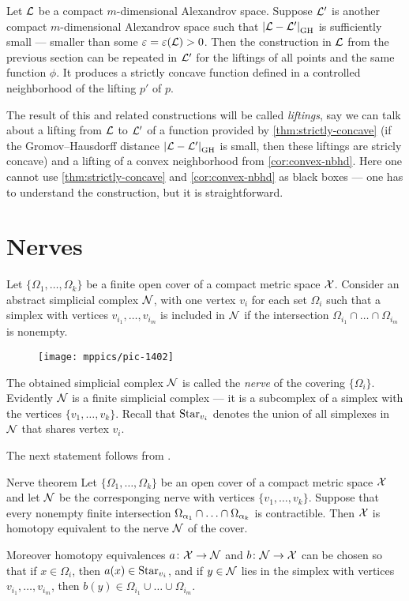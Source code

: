 Let $\mathcal{L}$ be  a compact $m$-dimensional Alexandrov space.
Suppose $\mathcal{L}'$ is another compact $m$-dimensional Alexandrov space such that $\dist{\spc{L}}{\spc{L}'}{\GH}$ is sufficiently small --- smaller than some $\varepsilon=\varepsilon(\mathcal{L})>0$.
Then the construction in $\mathcal{L}$ from the previous section  
can be repeated in $\mathcal{L}'$ for the liftings of all points and the same function $\phi$.
It produces a strictly concave function defined in a controlled neighborhood of the lifting $p'$ of $p$.

The result of this and related constructions will be called \emph{liftings},
say we can talk about a lifting from $\mathcal{L}$ to $\mathcal{L}'$ of a function provided by \ref{thm:strictly-concave} (if the Gromov--Hausdorff distance $\dist{\spc{L}}{\spc{L}'}{\GH}$ is small, then these liftings are stricly concave)
and a lifting of a convex neighborhood from \ref{cor:convex-nbhd}.
Here one cannot use \ref{thm:strictly-concave} and \ref{cor:convex-nbhd} as black boxes --- one has to understand the construction, but it is straightforward.

\section{Nerves}

Let $\{\Omega_1,\dots,\Omega_k\}$ be a finite open cover of a compact metric space $\mathcal{X}$.
Consider an abstract simplicial complex $\mathcal{N}$, with one vertex $v_i$ for each set $\Omega_i$ such that a simplex with vertices $v_{i_1},\dots, v_{i_m}$ is included in $\mathcal{N}$ if 
the intersection $\Omega_{i_1}\cap\dots\cap \Omega_{i_m}$ is nonempty.
\begin{figure}[ht!]
\vskip-0mm
\centering
\texttt{[image: mppics/pic-1402]}
\end{figure}
The obtained simplicial complex $\mathcal{N}$ is called the \emph{nerve} of the covering $\{\Omega_i\}$.
Evidently $\mathcal{N}$ is a finite simplicial complex ---
it is a subcomplex of a simplex with the vertices $\{v_1,\dots,v_k\}$.
Recall that $\mathop{\rm Star}\nolimits_{v_i}$ denotes the union of all simplexes in $\mathcal{N}$ that shares vertex $v_i$.

The next statement follows from \cite[4G.3]{hatcher}.


\begin{thm}{Nerve theorem}\label{thm:nerve}
Let $\{\Omega_1,\dots,\Omega_k\}$ be an open cover of a compact metric space $\mathcal{X}$
and let $\mathcal{N}$ be the corresponging nerve with vertices $\{v_1,\dots,v_k\}$.
Suppose that every nonempty finite intersection $\Omega_{\alpha_1}\cap\z\dots\cap\Omega_{\alpha_k}$ is contractible.
Then $\mathcal{X}$ is homotopy equivalent to the nerve $\mathcal{N}$ of the cover.

Moreover homotopy equivalences  $a\colon\mathcal{X}\to \mathcal{N}$ and $b\colon\mathcal{N}\to\mathcal{X}$ can be chosen so that 
if $x\in \Omega_i$, then $a(x)\in \mathop{\rm Star}\nolimits_{v_i}$,
and if $y\in\mathcal{N}$ lies in the simplex with vertices $v_{i_1},\dots, v_{i_m}$, then $b(y)\in \Omega_{i_1}\cup\dots\cup \Omega_{i_m}$.
\end{thm}

